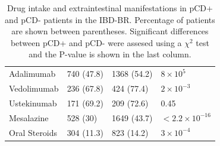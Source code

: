 \begin{table}
\begin{tabular}[t]{llll}
  \hspace{1em}Adalimumab & 740 (47.8) & 1368 (54.2) & $8\times10^{5}$\\
  \hspace{1em}Vedolimumab & 236 (67.8) & 424 (77.4) & $2\times10^{-3}$\\
  \hspace{1em}Ustekinumab & 171 (69.2) & 209 (72.6) & 0.45\\
  \hspace{1em}Mesalazine & 528 (30) & 1649 (43.7) & $< 2.2\times10^{-16}$\\
  \hspace{1em}Oral Steroids & 304 (11.3) & 823 (14.2) & $3\times10^{-4}$\\
 
  \bottomrule
  \end{tabular}
  \caption{Drug intake and extraintestinal manifestations in pCD+ and pCD- patients in the IBD-BR. Percentage of patients are shown between parentheses. Significant differences between pCD+ and pCD- were assesed using a $\chi^{2}$ test and the P-value is shown in the last column.}
  \label{table:drug_eim}
  \end{table}
  
